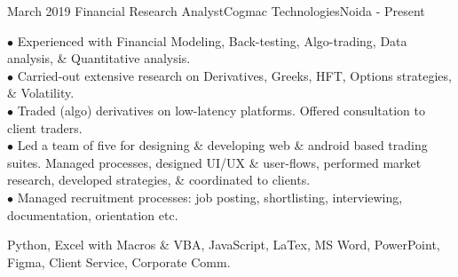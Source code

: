
\begin{experiences}
  \experience
    {March 2019}   {Financial Research Analyst}{Cogmac Technologies}{Noida \hspace{6ex} \hfill {}} 
    {- Present}
    {
\begin{description}
$\bullet$ Experienced with Financial Modeling, Back-testing, Algo-trading, Data analysis, \& Quantitative analysis.
\\ $\bullet$ Carried-out extensive research on Derivatives, Greeks, HFT, Options strategies, \& Volatility. 
\\$\bullet$ Traded (algo) derivatives on low-latency platforms. Offered consultation to client traders. \\$\bullet$ Led a team of five for designing \& developing web \& android based trading suites. Managed processes,
\hspace{19ex} designed UI/UX \& user-flows, performed market research, developed strategies, \& coordinated to clients. %
\\$\bullet$ Managed recruitment processes: job posting, shortlisting, interviewing, documentation, orientation etc. 
\end{description}
}
        {Python, Excel with Macros \& VBA, JavaScript, LaTex, MS Word, PowerPoint, Figma, Client Service, Corporate Comm.}
\end{experiences}


